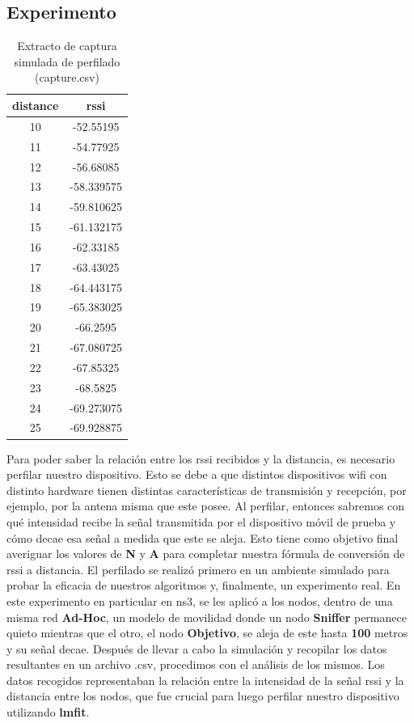 \subsection{Experimento}
\begin{table}[!htb]
\centering
\begin{tabular}{|c|c|}
\hline
distance & rssi \\
\hline
10 & -52.55195 \\
11 & -54.77925 \\
12 & -56.68085 \\
13 & -58.339575 \\
14 & -59.810625 \\
15 & -61.132175 \\
16 & -62.33185 \\
17 & -63.43025 \\
18 & -64.443175 \\
19 & -65.383025 \\
20 & -66.2595 \\
21 & -67.080725 \\
22 & -67.85325 \\
23 & -68.5825 \\
24 & -69.273075 \\
25 & -69.928875 \\
\hline
\end{tabular}
\caption{Extracto de captura simulada de perfilado (capture.csv)}
\label{table:1}
\end{table}
Para poder saber la relación entre los \acs{rssi} recibidos y la distancia, es necesario perfilar nuestro dispositivo. Esto se debe a que distintos dispositivos \acs{wifi} con distinto hardware tienen distintas características de transmisión y recepción, por ejemplo, por la antena misma que este posee. Al perfilar, entonces sabremos con qué intensidad recibe la señal transmitida por el dispositivo móvil de prueba y cómo decae esa señal a medida que este se aleja. Esto tiene como objetivo final averiguar los valores de \textbf{N} y \textbf{A} para completar nuestra fórmula de conversión de \acs{rssi} a distancia.
El perfilado se realizó primero en un ambiente simulado para probar la eficacia de nuestros algoritmos y, finalmente, un experimento real.
En este experimento en particular en \acs{ns3}, se les aplicó a los nodos, dentro de una misma red \textbf{Ad-Hoc}, un modelo de movilidad donde un nodo \textbf{Sniffer} permanece quieto mientras que el otro, el nodo \textbf{Objetivo}, se aleja de este hasta \textbf{100} metros y su señal decae.
Después de llevar a cabo la simulación y recopilar los datos resultantes en un archivo .csv, procedimos con el análisis de los mismos. Los datos recogidos representaban la relación entre la intensidad de la señal \acs{rssi} y la distancia entre los nodos, que fue crucial para luego perfilar nuestro dispositivo utilizando \textbf{lmfit}.
